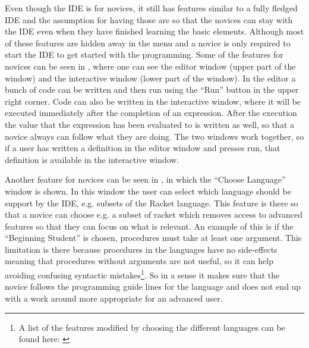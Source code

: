 Even though the IDE is for novices, it still has features similar to a fully fledged IDE and the assumption for having those are so that the novices can stay with the IDE even when they have finished learning the basic elements. Although most of these features are hidden away in the menu and a novice is only required to start the IDE to get started with the programming. Some of the features for novices can be seen in , where one can see the editor window (upper part of the window) and the interactive window (lower part of the window). In the editor a bunch of code can be written and then run using the ``Run'' button in the upper right corner. Code can also be written in the interactive window, where it will be executed immediately after the completion of an expression. After the execution the value that the expression has been evaluated to is written as well, so that a novice always can follow what they are doing. The two windows work together, so if a user has written a definition in the editor window and presses run, that definition is available in the interactive window.

Another feature for novices can be seen in , in which the ``Choose Language'' window is shown. In this window the user can select which language should be support by the IDE, e.g. subsets of the Racket language. This feature is there so that a novice can choose e.g. a subset of racket which removes access to advanced features so that they can focus on what is relevant. An example of this is if the ``Beginning Student'' is chosen, procedures must take at least one argument. This limitation is there because procedures in the languages have no side-effects meaning that procedures without arguments are not useful, so it can help avoiding confusing syntactic mistakes\cite{dr_racket_languages}\footnote{A list of the features modified by choosing the different languages can be found here: \cite{dr_racket_languages}}. So in a sense it makes sure that the novice follows the programming guide lines for the language and does not end up with a work around more appropriate for an advanced user.


